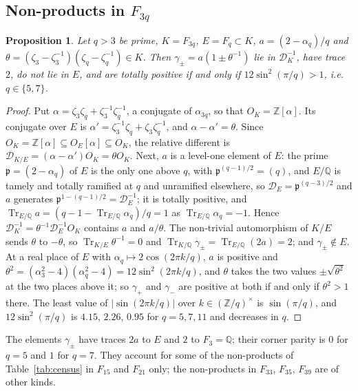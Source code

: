 \documentclass[11pt]{amsart}
\newcommand{\Q}{\mathbb{Q}}
\newcommand{\Z}{\mathbb{Z}}
\newcommand{\cod}[1]{\mathcal{D}_{#1}^{-1}}
\DeclareMathOperator{\Tr}{Tr}
\theoremstyle{plain}
\newtheorem{proposition}[theorem]{Proposition}
\theoremstyle{definition}
\begin{document}
\subsection{Non-products in \texorpdfstring{$F_{3q}$}{F\_3q}}\label{sec:family}
\begin{proposition}\label{prop:family}
Let $q > 3$ be prime, $K = F_{3q}$, $E = F_q \subset K$, $a = (2 - \alpha_q)/q$ and
$\theta = (\zeta_3 - \zeta_3^{-1})(\zeta_q - \zeta_q^{-1}) \in K$. Then
$\gamma_\pm = a(1 \pm \theta^{-1})$ lie in $\cod{K}$, have trace $2$, do not lie in $E$, and are
totally positive if and only if $12\sin^2(\pi/q) > 1$, i.e.\ $q \in \{5, 7\}$.
\end{proposition}

\begin{proof}
Put $\alpha = \zeta_3\zeta_q + \zeta_3^{-1}\zeta_q^{-1}$, a conjugate of $\alpha_{3q}$, so that
$O_K = \Z[\alpha]$. Its conjugate over $E$ is
$\alpha' = \zeta_3^{-1}\zeta_q + \zeta_3\zeta_q^{-1}$, and $\alpha - \alpha' = \theta$. Since
$O_K = \Z[\alpha] \subseteq O_E[\alpha] \subseteq O_K$, the relative different is
$\mathcal{D}_{K/E} = (\alpha - \alpha')O_K = \theta O_K$. Next, $a$ is a level-one element of $E$: the prime $\mathfrak{p} = (2 - \alpha_q)$ of $E$ is
the only one above $q$, with $\mathfrak{p}^{(q-1)/2} = (q)$, and $E/\Q$ is tamely and totally
ramified at $q$ and unramified elsewhere, so $\mathcal{D}_E = \mathfrak{p}^{(q-3)/2}$ and $a$ generates
$\mathfrak{p}^{1-(q-1)/2} = \cod{E}$; it is totally positive, and
$\Tr_{E/\Q}a = (q - 1 - \Tr_{E/\Q}\alpha_q)/q = 1$ as $\Tr_{E/\Q}\alpha_q = -1$. Hence
$\cod{K} = \theta^{-1}\cod{E}O_K$ contains $a$ and $a/\theta$. The non-trivial automorphism of $K/E$
sends $\theta$ to $-\theta$, so $\Tr_{K/E}\theta^{-1} = 0$ and $\Tr_{K/\Q}\gamma_\pm =
\Tr_{E/\Q}(2a) = 2$; and $\gamma_\pm \notin E$. At a real place of $E$ with
$\alpha_q \mapsto 2\cos(2\pi k/q)$, $a$ is positive and $\theta^2 = (\alpha_3^2 - 4)(\alpha_q^2 - 4)
= 12\sin^2(2\pi k/q)$, and $\theta$ takes the two values $\pm\sqrt{\theta^2}$ at the two places above it; so
$\gamma_+$ and $\gamma_-$ are positive at both if and only if $\theta^2 > 1$ there. The least value of $|\sin(2\pi k/q)|$ over $k \in (\Z/q)^\times$ is $\sin(\pi/q)$,
and $12\sin^2(\pi/q)$ is $4.15$, $2.26$, $0.95$ for $q = 5, 7, 11$ and decreases in $q$.
\end{proof}

The elements $\gamma_\pm$ have traces $2a$ to $E$ and $2$ to $F_3 = \Q$; their corner parity
is $0$ for $q = 5$ and $1$ for $q = 7$. They account for some of the non-products of
Table~\ref{tab:census} in $F_{15}$ and $F_{21}$ only; the non-products in $F_{33}$, $F_{35}$,
$F_{39}$ are of other kinds.
\end{document}
